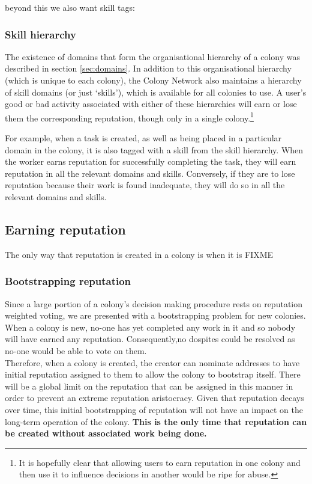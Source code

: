 beyond this we also want skill tags:

\subsubsection{Skill hierarchy}

The existence of domains that form the organisational hierarchy of a colony was described in section \ref{sec:domains}. In addition to this organisational hierarchy (which is unique to each colony), the Colony Network also maintains a hierarchy of skill domains (or just `skills'), which is available for all colonies to use. A user's good or bad activity associated with either of these hierarchies will earn or lose them the corresponding reputation, though only in a single colony.\footnote{It is hopefully clear that allowing users to earn reputation in one colony and then use it to influence decisions in another would be ripe for abuse.}

For example, when a task is created, as well as being placed in a particular domain in the colony, it is also tagged with a skill from the skill hierarchy. When the worker earns reputation for successfully completing the task, they will earn reputation in all the relevant domains and skills. Conversely, if they are to lose reputation because their work is found inadequate, they will do so in all the relevant domains and skills.

\subsection{Earning reputation}
The only way that reputation is created in a colony is when it is FIXME

\subsubsection{Bootstrapping reputation}

Since a large portion of a colony's decision making procedure rests on reputation weighted voting, we are presented with a bootstrapping problem for new colonies.
When a colony is new, no-one has yet completed any work in it and so nobody will have earned any reputation. Consequently,no dospites could be resolved as no-one would be able to vote on them. \\
Therefore, when a colony is created, the creator can nominate addresses to have initial reputation assigned to them to allow the colony to bootstrap itself. There will be a global limit on the reputation that can be assigned in this manner in order to prevent an extreme reputation aristocracy. Given that reputation decays over time, this initial bootstrapping of reputation will not have an impact on the long-term operation of the colony. \textbf{This is the only time that reputation can be created without associated work being done.}

